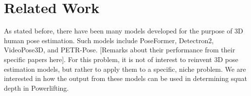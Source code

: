 \section{Related Work}
\label{sec:relatedwork}
As stated before, there have been many models developed for the purpose of 3D human pose estimation. Such models include PoseFormer, Detectron2, VideoPose3D, and PETR-Pose. [Remarks about their performance from their specific papers here]. For this problem, it is not of interest to reinvent 3D pose estimation models, but rather to apply them to a specific, niche problem. We are interested in how the output from these models can be used in determining squat depth in Powerlifting. 


